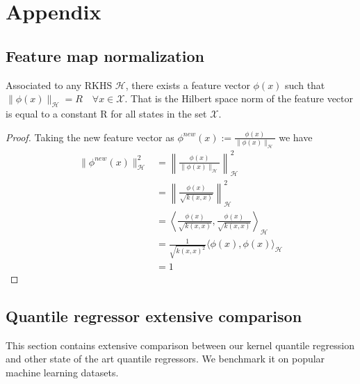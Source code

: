 \chapter{Appendix}
\section{Feature map normalization}\label{appendix:new_feature}

\begin{lemma}
    Associated to any RKHS $\mathcal{H}$, there exists a feature vector $\phi(x)$ such that $\|\phi(x)\|_{\mathcal{H}}=R \quad \forall x \in \mathcal{X}$.
    That is the Hilbert space norm of the feature vector is equal to a constant R for all states in the set $\mathcal{X}$.
\end{lemma}
\begin{proof}
    Taking the new feature vector as $\phi^{new} (x):=\frac{\phi(x)}{\|\phi(x)\|_{\mathcal{H}}}$ we have
\begin{align*}
    \|
    \phi^{new}(x)\|_{\mathcal{H}}^{2} &= \left\|\frac{\phi(x)}{\|\phi(x)\|_{\mathcal{H}}}
    \right\|_{\mathcal{H}}^{2}
    \\
    &=
    \left\|
    \frac{\phi(x)}
    {\sqrt{k(x,x)}}
    \right\|_{\mathcal{H}}^{2}
    \\
    &=
    \left\langle
    \frac{\phi(x)}
    {\sqrt{k(x,x)}}
    ,
    \frac{\phi(x)}
    {\sqrt{k(x,x)}}
    \right\rangle_{\mathcal{H}}
    \\
    &=
    \frac{1}{\sqrt{k(x,x)^{2}}}
    \langle
    \phi(x)
    ,
    \phi(x)
    \rangle_{\mathcal{H}}
    \\
    &=1
\end{align*}
\end{proof}



\section{Quantile regressor extensive comparison}\label{appendix:quantile_regressor_extensive_comparison}
This section contains extensive comparison between our kernel quantile regression and other state of the art quantile regressors. We benchmark it on popular machine learning datasets.
